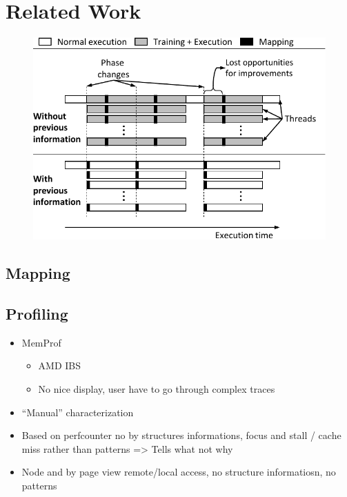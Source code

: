 
\section{Related Work}
\label{sec:soa}
\begin{figure}[!b]
    \includegraphics[width=\linewidth]{img/timeline}
\end{figure}


\subsection{Mapping}
\label{sec:soa-mapping}
\subsection{Profiling}
\label{sec:soa-profiling}

\begin{itemize}
    \item MemProf \cite{Lachaize12MemProf}
        \begin{itemize}
            \item AMD IBS
            \item No nice display, user have to go through complex traces
        \end{itemize}
    \item ``Manual'' characterization \cite{Majo13(Mis)understanding,Jiang14Understanding}

    \item Based on perfcounter no by structures informations, focus and stall
        / cache miss rather than patterns \cite{Bosch00Rivet, Weyers14Visualization}
        => Tells what not why
    \item Node and by page view remote/local access, no structure informatiosn,
        no patterns \cite{Tao01Visualizing}
\end{itemize}



